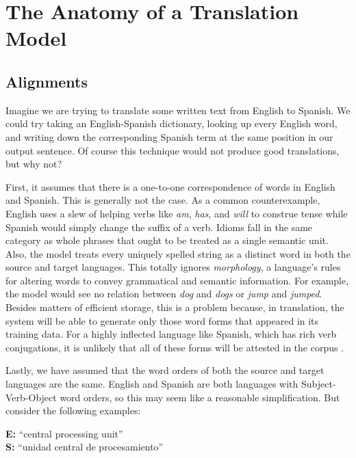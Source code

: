 \documentclass[11pt]{article}
\begin{document}
\section{The Anatomy of a Translation Model}
\subsection{Alignments}
\label{desiderata}
Imagine we are trying to translate some written text from English to Spanish.
We could try taking an English-Spanish dictionary, looking up every English word,
and writing down the corresponding Spanish term at the same position in our output sentence.
Of course this technique would not produce good translations, but why not?

First, it assumes that there is a one-to-one correspondence of words in English and Spanish.
This is generally not the case. As a common counterexample, English uses a slew of 
helping verbs like \emph{am}, \emph{has}, and \emph{will} to construe tense
while Spanish would simply change the suffix of a verb.
Idioms fall in the same category as whole phrases that ought to be treated as a single semantic unit.
Also, the model treats every uniquely spelled string as a distinct word in both the source and target languages.
This totally ignores \textit{morphology}, a language's rules for altering words to convey grammatical
and semantic information. For example, the model would see no relation between \textit{dog} and \textit{dogs}
or \textit{jump} and \textit{jumped}. Besides matters of efficient storage, this is a problem because,
in translation, the system will be able to generate only those word forms that appeared in its training data.
For a highly inflected language like Spanish, which has rich verb conjugations, it is unlikely that
all of these forms will be attested in the corpus \cite{brown:93}.

Lastly, we have assumed that the word orders of both the source and target languages are the same.
English and Spanish are both languages with Subject-Verb-Object word orders,
so this may seem like a reasonable simplification. But consider the following examples:

\bigskip

\indent\textbf{E:} ``central processing unit'' \\
\indent\textbf{S:} ``unidad central de procesamiento'' \\

\medskip
\end{document}

